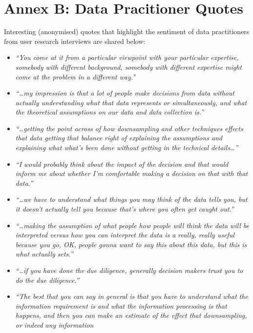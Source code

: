 \documentclass{article}
\begin{document}
\hypertarget{annex-b-data-pracitioner-quotes}{%
\section{Annex B: Data Pracitioner
Quotes}\label{annex-b-data-pracitioner-quotes}}

Interesting (anonymised) quotes that highlight the sentiment of data
practitioners from user research interviews are shared below:

\begin{itemize}
\item
  \emph{``You come at it from a particular viewpoint with your
  particular expertise, somebody with different background, somebody
  with different expertise might come at the problem in a different
  way.''}
\item
  \emph{``\ldots my impression is that a lot of people make decisions
  from data without actually understanding what that data represents or
  simultaneously, and what the theoretical assumptions on our data and
  data collection is.''}
\item
  \emph{``\ldots getting the point across of how downsampling and other
  techniques effects that data getting that balance right of explaining
  the assumptions and explaining what what's been done without getting
  in the technical details\ldots{}''}
\item
  \emph{``I would probably think about the impact of the decision and
  that would inform me about whether I'm comfortable making a decision
  on that with that data.''}
\item
  \emph{``\ldots we have to understand what things you may think of the
  data tells you, but it doesn't actually tell you because that's where
  you often get caught out.''}
\item
  \emph{``\ldots making the assumption of what people how people will
  think the data will be interpreted versus how you can interpret the
  data is a really, really useful because you go, OK, people gonna want
  to say this about this data, but this is what actually sets.''}
\item
  \emph{``\ldots if you have done the due diligence, generally decision
  makers trust you to do the due diligence.''}
\item
  \emph{``The best that you can say in general is that you have to
  understand what the information requirement is and what the
  information processing is that happens, and then you can make an
  estimate of the effect that downsampling, or indeed any information
}
\end{itemize}
\end{document}
